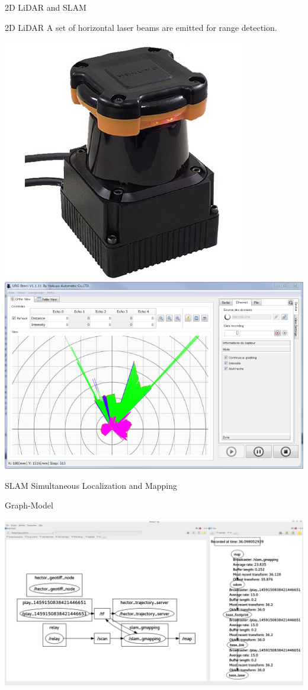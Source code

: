 \documentclass[10pt]{beamer}
\begin{document}
 \begin{frame}[allowframebreaks]{2D LiDAR and SLAM}
  \begin{block}{2D LiDAR}
   A set of horizontal laser beams are emitted for range detection.
   \begin{center}
    \includegraphics[height=0.3\textheight]{Hokuyo.jpg}
    \includegraphics[height=0.3\textheight]{UrgBenri_screenshot.png}
   \end{center}
  \end{block}
  \begin{block}{SLAM}
   Simultaneous Localization and Mapping
  \end{block}
  \begin{block}{Graph-Model}
   \begin{center}
    \includegraphics[width=1\textwidth]{graph-tf.png}

\end{center}
\end{block}
\end{frame}
\end{document}
